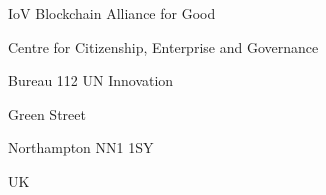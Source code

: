 \documentclass[twoside,twocolumn]{article}
\begin{document}
IoV Blockchain Alliance for Good

Centre for Citizenship, Enterprise and Governance

Bureau 112 UN Innovation

Green Street

Northampton NN1 1SY

UK








\end{document}
